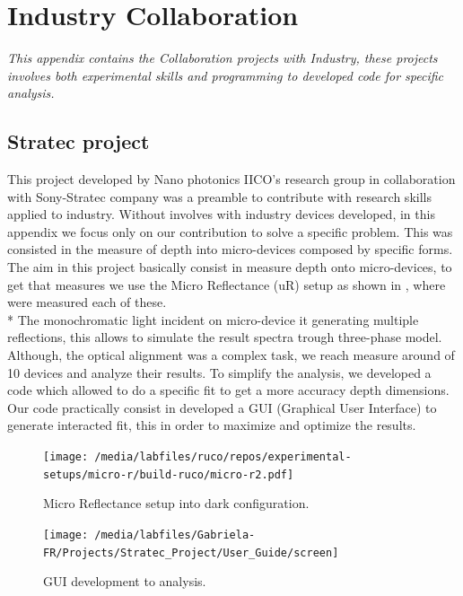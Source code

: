 \chapter{Industry Collaboration}
\label{chap:appendix3}
\textit{This appendix contains the Collaboration projects with Industry, these projects involves both experimental skills and programming to developed code for specific analysis.  }
\vfill
\minitoc
\newpage

\allowdisplaybreaks
\section{Stratec project}
\vspace{-1cm}
This project developed by Nano photonics IICO's research group in collaboration with Sony-Stratec company was a preamble to contribute with research skills applied to industry. Without involves with industry devices developed, in this appendix we focus only on our contribution to solve a specific problem.  This was consisted in the measure of depth into micro-devices composed by specific forms. The aim in this project basically consist in measure depth onto micro-devices, to get that measures we use the Micro Reflectance (\gls{uR}) setup as shown in , where were measured each of these. \\*
The monochromatic light incident on micro-device it generating multiple reflections, this allows to simulate the result spectra trough three-phase model\cite{lastras2017optical}. Although, the optical alignment was a complex task, we reach measure around of 10 devices and analyze their results. 
To simplify the analysis, we developed a code  which allowed to do a specific fit to get a more accuracy depth dimensions. Our code practically consist in developed a GUI (Graphical User Interface) to generate interacted fit, this in order to maximize and optimize the results. 
\begin{figure}[hbtp!]
    \centering
    \texttt{[image: /media/labfiles/ruco/repos/experimental-setups/micro-r/build-ruco/micro-r2.pdf]}
    \caption{Micro Reflectance setup into dark configuration.}
    \label{fig:appendix3-micro-ras}
\end{figure}
\begin{landscape}
    \begin{figure}
        \centering
        \texttt{[image: /media/labfiles/Gabriela-FR/Projects/Stratec\_Project/User\_Guide/screen]}
        \caption{GUI development to analysis.}
        \label{fig:appendix3-gui}
    \end{figure}
    \end{landscape}
